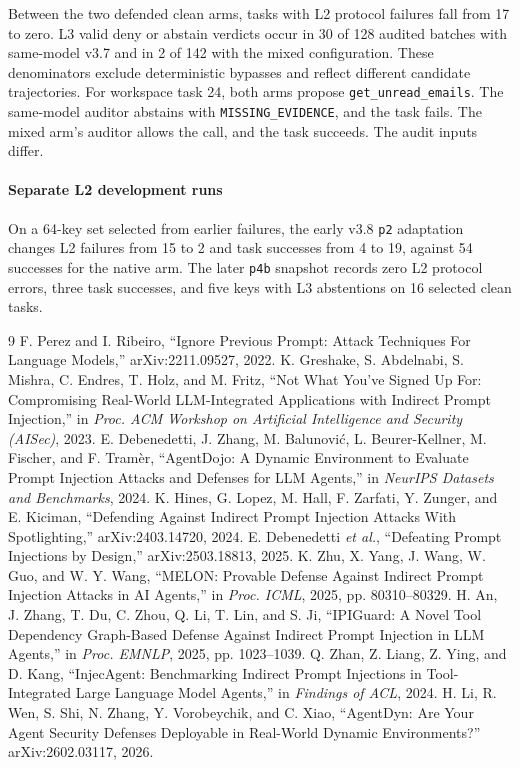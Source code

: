 \documentclass[conference]{IEEEtran}
\begin{document}
Between the two defended clean arms, tasks with L2 protocol failures fall from 17 to zero. L3 valid deny or abstain verdicts occur in 30 of 128 audited batches with same-model v3.7 and in 2 of 142 with the mixed configuration. These denominators exclude deterministic bypasses and reflect different candidate trajectories. For workspace task 24, both arms propose \texttt{get\_unread\_emails}. The same-model auditor abstains with \texttt{MISSING\_EVIDENCE}, and the task fails. The mixed arm's auditor allows the call, and the task succeeds. The audit inputs differ.

\paragraph{Separate L2 development runs}
On a 64-key set selected from earlier failures, the early v3.8 \texttt{p2} adaptation changes L2 failures from 15 to 2 and task successes from 4 to 19, against 54 successes for the native arm. The later \texttt{p4b} snapshot records zero L2 protocol errors, three task successes, and five keys with L3 abstentions on 16 selected clean tasks.

\begin{thebibliography}{9}
 F. Perez and I. Ribeiro, ``Ignore Previous Prompt: Attack Techniques For Language Models,'' arXiv:2211.09527, 2022.
 K. Greshake, S. Abdelnabi, S. Mishra, C. Endres, T. Holz, and M. Fritz, ``Not What You've Signed Up For: Compromising Real-World LLM-Integrated Applications with Indirect Prompt Injection,'' in \emph{Proc. ACM Workshop on Artificial Intelligence and Security (AISec)}, 2023.
 E. Debenedetti, J. Zhang, M. Balunovi\'{c}, L. Beurer-Kellner, M. Fischer, and F. Tram\`{e}r, ``AgentDojo: A Dynamic Environment to Evaluate Prompt Injection Attacks and Defenses for LLM Agents,'' in \emph{NeurIPS Datasets and Benchmarks}, 2024.
 K. Hines, G. Lopez, M. Hall, F. Zarfati, Y. Zunger, and E. Kiciman, ``Defending Against Indirect Prompt Injection Attacks With Spotlighting,'' arXiv:2403.14720, 2024.
 E. Debenedetti \emph{et al.}, ``Defeating Prompt Injections by Design,'' arXiv:2503.18813, 2025.
 K. Zhu, X. Yang, J. Wang, W. Guo, and W. Y. Wang, ``MELON: Provable Defense Against Indirect Prompt Injection Attacks in AI Agents,'' in \emph{Proc. ICML}, 2025, pp. 80310--80329.
 H. An, J. Zhang, T. Du, C. Zhou, Q. Li, T. Lin, and S. Ji, ``IPIGuard: A Novel Tool Dependency Graph-Based Defense Against Indirect Prompt Injection in LLM Agents,'' in \emph{Proc. EMNLP}, 2025, pp. 1023--1039.
 Q. Zhan, Z. Liang, Z. Ying, and D. Kang, ``InjecAgent: Benchmarking Indirect Prompt Injections in Tool-Integrated Large Language Model Agents,'' in \emph{Findings of ACL}, 2024.
 H. Li, R. Wen, S. Shi, N. Zhang, Y. Vorobeychik, and C. Xiao, ``AgentDyn: Are Your Agent Security Defenses Deployable in Real-World Dynamic Environments?'' arXiv:2602.03117, 2026.
\end{thebibliography}
\end{document}
